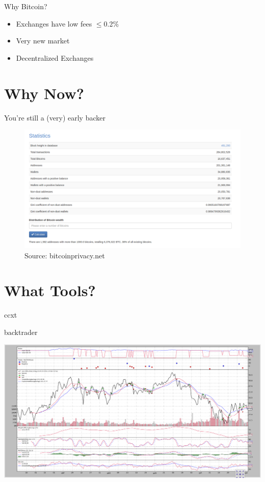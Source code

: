 \documentclass{beamer}
\begin{document}
\begin{frame}{Why Bitcoin?}
  \begin{itemize}
    \item Exchanges have low fees $\leq$0.2\%
    \item Very new market
    \item Decentralized Exchanges
  \end{itemize}
\end{frame}

\section{Why Now?}

\begin{frame}{You're still a (very) early backer}
  \begin{figure}
    \begin{center}
      \includegraphics[scale=0.21]{images/statistics}
      \caption{Source: bitcoinprivacy.net \cite{NumAdd}}
    \end{center}
  \end{figure}
\end{frame}

\section{What Tools?}

\begin{frame}{ccxt}
  
\end{frame}

\begin{frame}{backtrader}
  \begin{center}
    \includegraphics[scale=0.21]{images/quickstart}
  \end{center}
\end{frame}
\end{document}
